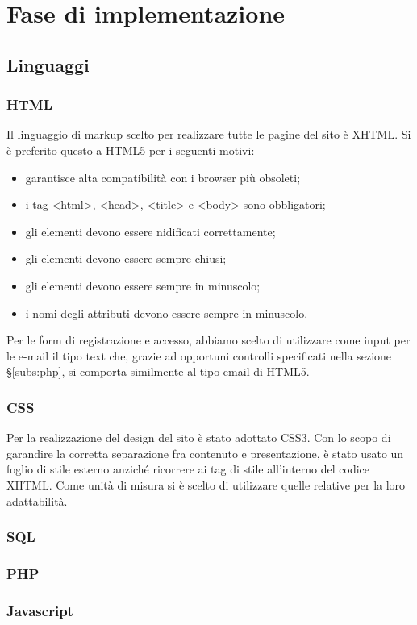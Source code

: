 \section{Fase di implementazione}
\subsection{Linguaggi}
\subsubsection{HTML}
Il linguaggio di markup scelto per realizzare tutte le pagine del sito è XHTML. Si è preferito questo a HTML5 per i seguenti motivi:
\begin{itemize}
    \item garantisce alta compatibilità con i browser più obsoleti;
    \item i tag <html>, <head>, <title> e <body> sono obbligatori;
	\item gli elementi devono essere nidificati correttamente;
	\item gli elementi devono essere sempre chiusi;
	\item gli elementi devono essere sempre in minuscolo;
	\item i nomi degli attributi devono essere sempre in minuscolo.
\end{itemize}

Per le form di registrazione e accesso, abbiamo scelto di utilizzare come input per le e-mail il tipo text che, grazie ad opportuni controlli specificati nella sezione \S\ref{subs:php}, 
si comporta similmente al tipo email di HTML5.

\subsubsection{CSS}
Per la realizzazione del design del sito è stato adottato CSS3. 
Con lo scopo di garandire la corretta separazione fra contenuto e presentazione, è stato usato un foglio di stile esterno anziché ricorrere ai tag di stile all'interno del codice XHTML. 
Come unità di misura si è scelto di utilizzare quelle relative per la loro adattabilità.
\subsubsection{SQL}
\subsubsection{PHP}
\subsubsection{Javascript}
